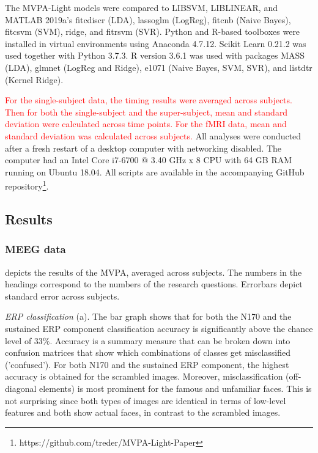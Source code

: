 \documentclass[utf8]{frontiersSCNS} %
\newcommand{\red}[1]{\textcolor{red}{#1}}
\begin{document}
The MVPA-Light models were compared to LIBSVM,  LIBLINEAR, and MATLAB 2019a's fitcdiscr (LDA), lassoglm (LogReg), fitcnb (Naive Bayes), fitcsvm (SVM), ridge, and fitrsvm (SVR). Python and R-based toolboxes were installed in virtual environments using Anaconda 4.7.12. Scikit Learn 0.21.2 was used together with Python 3.7.3. R version 3.6.1 was used with packages MASS (LDA), glmnet (LogReg and Ridge), e1071 (Naive Bayes, SVM, SVR), and listdtr (Kernel Ridge).

\red{For the single-subject data, the timing results were averaged across subjects. Then for both the single-subject and the super-subject, mean and standard deviation were calculated across time points. For the fMRI data, mean and standard deviation was calculated across subjects.} All analyses were conducted after a fresh restart of a desktop computer with networking disabled. The computer had an Intel Core i7-6700 @ 3.40 GHz x 8 CPU with 64 GB RAM running on Ubuntu 18.04. All scripts are available in the accompanying GitHub repository\footnote{https://github.com/treder/MVPA-Light-Paper}.

\subsection{Results}

\subsubsection{MEEG data}
 depicts the results of the MVPA, averaged across subjects. The numbers in the headings correspond to the numbers of the research questions. Errorbars depict standard error across subjects.

\textit{ERP classification} (a). The bar graph shows that for both the N170 and the sustained ERP component classification accuracy is significantly above the chance level of 33\%. Accuracy is a summary measure that can be broken down into confusion matrices that show which combinations of classes get misclassified ('confused'). For both N170 and the sustained ERP component, the highest accuracy is obtained for the scrambled images. Moreover,  misclassification (off-diagonal elements) is most prominent for the famous and unfamiliar faces. This is not surprising since both types of images are identical in terms of low-level features and both show actual faces, in contrast to the scrambled images.
\end{document}
